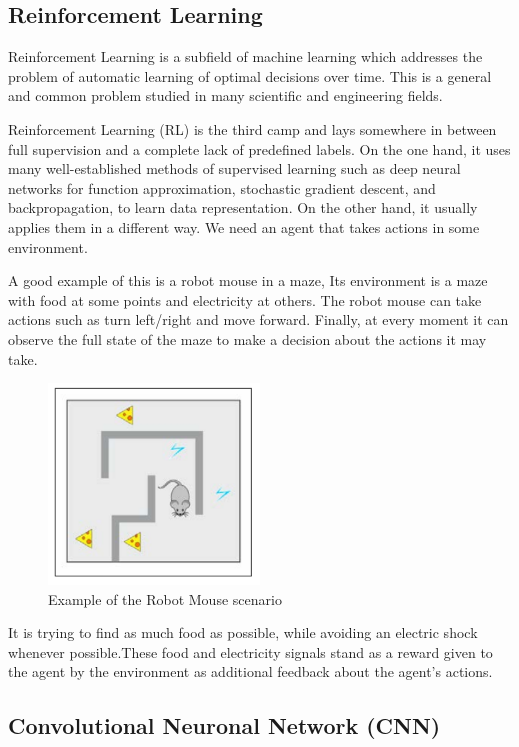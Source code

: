 \subsection[Reinforcement Learning]{Reinforcement Learning}

Reinforcement Learning is a subfield of machine learning which addresses
the problem of automatic learning of optimal decisions over time. This is
a general and common problem studied in many scientific and engineering fields.\cite{reinforcement-learning}

Reinforcement Learning (RL) is the third camp and lays somewhere in between full supervision and a complete lack of predefined labels. On the one hand, it uses many well-established methods of supervised learning such as deep neural networks for function approximation, stochastic gradient descent, and backpropagation, to learn data representation.
On the other hand, it usually applies them in a different way. We need an agent that takes actions in some environment.

A good example of this is a robot mouse in a maze, Its environment is a maze with food at some points and electricity at others. The robot
mouse can take actions such as turn left/right and move forward. Finally, at every moment it can observe the full state of the maze to make a 
decision about the actions it may take.
\begin{figure}[H]
\centering
\includegraphics[width=0.5\textwidth]{./figures/robotmouse-maze}
\caption{Example of the Robot Mouse scenario \cite{reinforcement-learning}}
\end{figure}
It is trying to find as much food as  possible, while avoiding an electric shock whenever possible.These food and electricity signals stand as a reward given to the agent by the environment as additional feedback about the agent's actions.


\subsection[Convolutional Neuronal Network (CNN)]{Convolutional Neuronal Network (CNN)}



